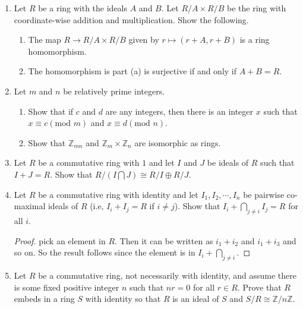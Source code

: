\documentclass{article}
\theoremstyle{definition}
\newcommand{\m}[1]{(\text{mod }{#1})}
\newcommand{\Z}{\mathbb{Z}}
\begin{document}
\begin{enumerate}
            \item Let $R$ be a ring with the ideals $A$ and $B$. Let $R/A\times R/B$ be the ring with coordinate-wise addition and multiplication. Show the following.
            
            \begin{enumerate}
                \item The map $R\to R/A\times R/B$ given by $r\mapsto (r+A,r+B)$ is a ring homomorphism. 
                \item The homomorphism is part (a) is surjective if and only if $A+B=R$.
            \end{enumerate}

            \item Let $m$ and $n$ be relatively prime integers. 
            
            \begin{enumerate}
                \item Show that if $c$ and $d$ are any integers, then there is an integer $x$ such that $x\equiv c \m{m}$ and $x\equiv d \m{n}$.
                \item Show that $\Z_{mn}$ and $\Z_m \times \Z_n$ are isomorphic as rings.
            \end{enumerate}

            \item Let $R$ be a commutative ring with $1$ and let $I$ and $J$ be ideals of $R$ such that $I+J=R$. Show that $R/(I\bigcap J) \cong R/I \oplus R/J$.
            
            \item Let $R$ be a commutative ring with identity and let $I_1, I_2, \dotsb , I_n$ be pairwise co-maximal ideals of $R$ (i.e, $I_i+I_j=R$ if $i\neq j$). Show that $I_i+\bigcap_{j\neq i} I_j=R$ for all $i$.
            
            \begin{proof}
                pick an element in $R$. Then it can be written as $i_1+i_2$ and $i_1+i_3$ and so on. So the result follows since the element is in $I_i+\bigcap_{j\neq i}$.
            \end{proof}

            \item Let $R$ be a commutative ring, not necessarily with identity, and assume there is some fixed positive integer $n$ such that $nr=0$ for all $r\in R$. Prove that $R$ embeds in a ring $S$ with identity so that $R$ is an ideal of $S$ and $S/R\cong \Z/n\Z$.
            

\end{enumerate}
\end{document}
